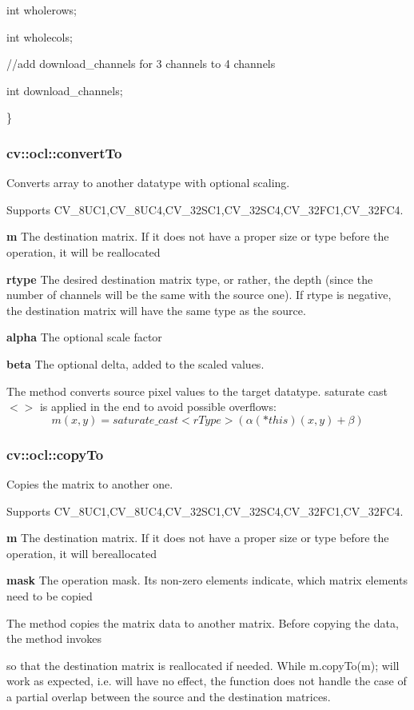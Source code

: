 \documentclass{article}
\begin{document}
     int wholerows;

     int wholecols;

     //add download\_channels for 3 channels to 4 channels

     int download\_channels;

\}

\subsubsection{cv::ocl::convertTo}
\label{subsubsec:mylabel1}
Converts array to another datatype with optional scaling.

Supports CV{\_}8UC1,CV{\_}8UC4,CV{\_}32SC1,CV{\_}32SC4,CV{\_}32FC1,CV{\_}32FC4.

\textbf{m }The destination matrix. If it does not have a proper size or type
before the operation, it will be reallocated

\textbf{rtype }The desired destination matrix type, or rather, the depth
(since the number of channels will be the same with the source one). If
rtype is negative, the destination matrix will have the same type as the
source.

\textbf{alpha }The optional scale factor

\textbf{beta }The optional delta, added to the scaled values.

The method converts source pixel values to the target datatype. saturate
cast$<>$ is applied in the end to avoid possible overflows:
\[
m(x,y)=saturate\_cast<rType>(\alpha (\ast this)(x,y)+\beta )
\]
\newpage

\subsubsection{cv::ocl::copyTo}
\label{subsubsec:mylabel2}
Copies the matrix to another one.

Supports CV{\_}8UC1,CV{\_}8UC4,CV{\_}32SC1,CV{\_}32SC4,CV{\_}32FC1,CV{\_}32FC4.

\textbf{m }The destination matrix. If it does not have a proper size or type
before the operation, it will bereallocated

\textbf{mask }The operation mask. Its non-zero elements indicate, which
matrix elements need to be copied

The method copies the matrix data to another matrix. Before copying the
data, the method invokes

so that the destination matrix is reallocated if needed. While m.copyTo(m);
will work as expected, i.e. will have no effect, the function does not
handle the case of a partial overlap between the source and the destination
matrices.
\end{document}

